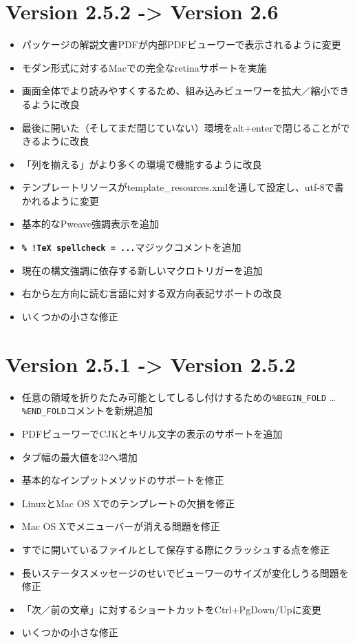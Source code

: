 \section{Version 2.5.2 -\textgreater{} Version 2.6}

\begin{itemize}
\item
  パッケージの解説文書PDFが内部PDFビューワーで表示されるように変更
\item
  モダン形式に対するMacでの完全なretinaサポートを実施
\item
  画面全体でより読みやすくするため、組み込みビューワーを拡大／縮小できるように改良
\item
  最後に開いた（そしてまだ閉じていない）環境をalt+enterで閉じることができるように改良
\item
  「列を揃える」がより多くの環境で機能するように改良
\item
  テンプレートリソースがtemplate\_resources.xmlを通して設定し、utf-8で書かれるように変更
\item
  基本的なPweave強調表示を追加
\item
  \textbf{\texttt{\% !TeX spellcheck = ...}}マジックコメントを追加
\item
  現在の構文強調に依存する新しいマクロトリガーを追加
\item
  右から左方向に読む言語に対する双方向表記サポートの改良
\item
  いくつかの小さな修正
\end{itemize}

\section{Version 2.5.1 -\textgreater{} Version 2.5.2}

\begin{itemize}
\item
  任意の領域を折りたたみ可能としてしるし付けするための\verb+%BEGIN_FOLD+
  \ldots{} \verb+%END_FOLD+コメントを新規追加
\item
  PDFビューワーでCJKとキリル文字の表示のサポートを追加
\item
  タブ幅の最大値を32へ増加
\item
  基本的なインプットメソッドのサポートを修正
\item
  LinuxとMac OS Xでのテンプレートの欠損を修正
\item
  Mac OS Xでメニューバーが消える問題を修正
\item
  すでに開いているファイルとして保存する際にクラッシュする点を修正
\item
  長いステータスメッセージのせいでビューワーのサイズが変化しうる問題を修正
\item
  「次／前の文章」に対するショートカットをCtrl+PgDown/Upに変更
\item
  いくつかの小さな修正
\end{itemize}

